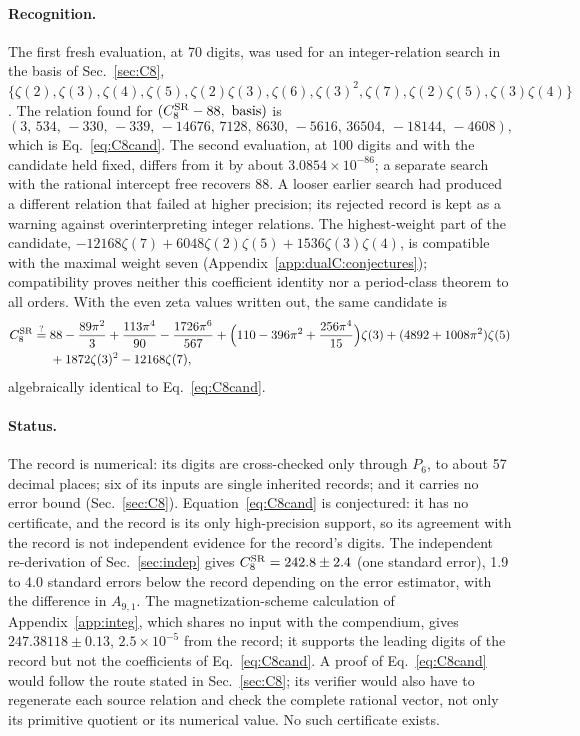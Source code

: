 \documentclass[11pt,a4paper]{article}
\numberwithin{equation}{section}
\newcommand{\CSR}{C^{\rm SR}}
\newcommand{\sci}[2]{#1\times10^{#2}}
\begin{document}
\paragraph{Recognition.} The first fresh evaluation, at 70 digits, was used for an integer-relation search in the
basis of Sec.~\ref{sec:C8}, $\{\zeta(2),\zeta(3),\zeta(4),\zeta(5),\zeta(2)\zeta(3),\zeta(6),\zeta(3)^2,\zeta(7),
\zeta(2)\zeta(5),\zeta(3)\zeta(4)\}$. The relation found for $(\CSR_8-88,\ \text{basis})$ is
\begin{equation}
 (3,\,534,\,-330,\,-339,\,-14676,\,7128,\,8630,\,-5616,\,36504,\,-18144,\,-4608),
\end{equation}
which is Eq.~\eqref{eq:C8cand}. The second evaluation, at 100 digits and with the candidate held fixed, differs from
it by about $\sci{3.0854}{-86}$; a separate search with the rational intercept free recovers $88$. A looser earlier
search had produced a different relation that failed at higher precision; its rejected record is kept as a warning
against overinterpreting integer relations. The highest-weight part of the candidate,
$-12168\zeta(7)+6048\zeta(2)\zeta(5)+1536\zeta(3)\zeta(4)$, is compatible with the maximal weight seven
(Appendix~\ref{app:dualC:conjectures}); compatibility proves neither this coefficient identity nor a period-class theorem
to all orders. With the even zeta values written out, the same candidate is
\begin{equation}
\begin{aligned}
 \CSR_8\overset{?}{=}{}&88-\frac{89\pi^2}{3}+\frac{113\pi^4}{90}-\frac{1726\pi^6}{567}
 +\Bigl(110-396\pi^2+\frac{256\pi^4}{15}\Bigr)\zeta(3)+(4892+1008\pi^2)\zeta(5)\\
 &+1872\zeta(3)^2-12168\zeta(7),
\end{aligned}
\end{equation}
algebraically identical to Eq.~\eqref{eq:C8cand}.

\paragraph{Status.} The record is numerical: its digits are cross-checked only through $P_6$, to about 57 decimal
places; six of its inputs are single inherited records; and it carries no error bound (Sec.~\ref{sec:C8}).
Equation~\eqref{eq:C8cand} is conjectured: it has no certificate, and the record is its only high-precision support, so its agreement
with the record is not independent evidence for the record's digits. The independent re-derivation of
Sec.~\ref{sec:indep} gives $\CSR_8=242.8\pm2.4$ (one standard error), 1.9 to 4.0 standard errors below the record
depending on the error estimator, with the difference in $A_{9,1}$. The magnetization-scheme calculation of
Appendix~\ref{app:integ}, which shares no input with the compendium, gives $247.38118\pm0.13$, $\sci{2.5}{-5}$ from the
record; it supports the leading digits of the record but not the coefficients of Eq.~\eqref{eq:C8cand}. A proof of
Eq.~\eqref{eq:C8cand} would follow the
route stated in Sec.~\ref{sec:C8}; its verifier would also have to regenerate each source relation and check the
complete rational vector, not only its primitive quotient or its numerical value. No such certificate exists.
\end{document}
